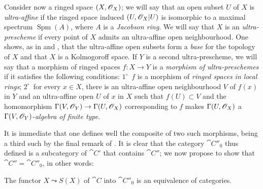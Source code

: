 
\begin{env}[10.9.5]
\label{IV.10.9.5}
Consider now a ringed space $(X,\mathscr{O}_X)$; we will say that an open subset $U$ of $X$ is \emph{ultra-affine} if the ringed space induced $(U,\mathscr{O}_X|U)$ is isomorphic to a maximal spectrum $\operatorname{Spm}(A)$, where $A$ is a \emph{Jacobson ring}.
We will say that $X$ is an \emph{ultra-prescheme} if every point of $X$ admits an ultra-affine open neighbourhood.
One shows, as in  and , that the ultra-affine open subsets form a \emph{base} for the topology of $X$ and that $X$ is a Kolmogoroff space.
If $Y$ is a second ultra-prescheme, we will say that a morphism of ringed spaces $f:X\to Y$ is a \emph{morphism of ultra-preschemes} if it satisfies the following conditions: $1^\circ$~$f$ is a morphism of \emph{ringed spaces in local rings}; $2^\circ$~for every $x\in X$, there is an ultra-affine open neighbourhood $V$ of $f(x)$ in $Y$ and an ultra-affine open $U$ of $x$ in $X$ such that $f(U)\subset V$ and the homomorphism $\Gamma(V,\mathscr{O}_Y)\to\Gamma(U,\mathscr{O}_X)$ corresponding to $f$ makes $\Gamma(U,\mathscr{O}_X)$ a $\Gamma(V,\mathscr{O}_Y)$-\emph{algebra of finite type}.

It is immediate that one defines well the composite of two such morphisms, being a third such by the final remark of .
It is clear that the category $\cat{C}''_0$ thus defined is a subcategory of $\cat{C}'$ that contains $\cat{C}''$; we now propose to show that $\cat{C}''=\cat{C}''_0$, in other words:
\end{env}

\begin{proposition}[10.9.6]
\label{IV.10.9.6}
The functor $X\leadsto S(X)$ of $\cat{C}$ into $\cat{C}''_0$ is an equivalence of categories.
\end{proposition}

